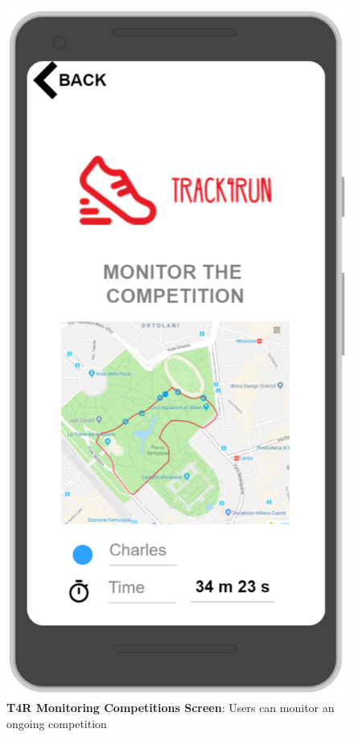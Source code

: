 \begin{figure}[H]
\centering
\includegraphics[scale = 0.5]{Mocks/Mobile_T4R_Monitoring.PNG}
\caption{\textbf{T4R Monitoring Competitions Screen}: Users can monitor an ongoing competition}
\end{figure}
\clearpage
